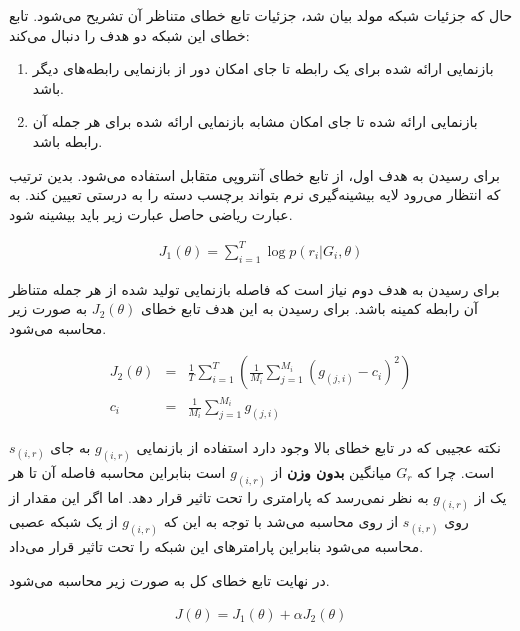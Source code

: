حال که جزئیات شبکه مولد بیان شد، جزئیات تابع خطای متناظر آن تشریح می‌شود. تابع خطای این شبکه دو هدف را دنبال می‌کند:

\begin{enumerate}
    \item بازنمایی ارائه شده برای یک رابطه تا جای امکان دور از بازنمایی رابطه‌های دیگر باشد.
    \item بازنمایی ارائه شده تا جای امکان مشابه بازنمایی ارائه شده برای هر جمله آن رابطه باشد.
\end{enumerate}

برای رسیدن به هدف اول، از تابع خطای آنتروپی متقابل استفاده می‌شود. بدین ترتیب که انتظار می‌رود لایه بیشینه‌گیری‌ نرم
بتواند برچسب دسته را به درستی تعیین کند. به عبارت ریاضی حاصل عبارت زیر باید بیشینه شود.

\begin{eqnarray}
    J_1(\theta) = \sum_{i=1}^{T} \log p(r_i|G_i,\theta)
\end{eqnarray}

برای رسیدن به هدف دوم نیاز است که فاصله بازنمایی تولید شده از هر جمله متناظر آن رابطه کمینه باشد. برای رسیدن
به این هدف تابع خطای $J_2(\theta)$ به صورت زیر محاسبه می‌شود.

\begin{eqnarray}
    J_2(\theta) & = & \frac{1}{T} \sum_{i=1}^{T} (\frac{1}{M_i} \sum_{j=1}^{M_i} (g_{(j,i)} - c_i)^2) \\
    c_i & = & \frac{1}{M_i} \sum_{j=1}^{M_i} g_{(j,i)}
\end{eqnarray}

نکته عجیبی که در تابع خطای بالا وجود دارد استفاده از بازنمایی $g_{(i,r)}$ به جای $s_{(i,r)}$ است. چرا که
$G_r$ میانگین \textbf{بدون وزن} از $g_{(i,r)}$ است بنابراین محاسبه فاصله آن تا هر یک از $g_{(i,r)}$ به نظر نمی‌رسد که
پارامتری را تحت تاثیر قرار دهد. اما اگر این مقدار از روی $s_{(i,r)}$ از روی محاسبه می‌شد با توجه به این که $g_{(i,r)}$
از یک شبکه عصبی محاسبه می‌شود بنابراین پارامتر‌های این شبکه را تحت تاثیر قرار می‌داد.

در نهایت تابع خطای کل به صورت زیر محاسبه می‌شود.

\begin{eqnarray}
    J(\theta) = J_1(\theta) + \alpha J_2(\theta)
\end{eqnarray}

